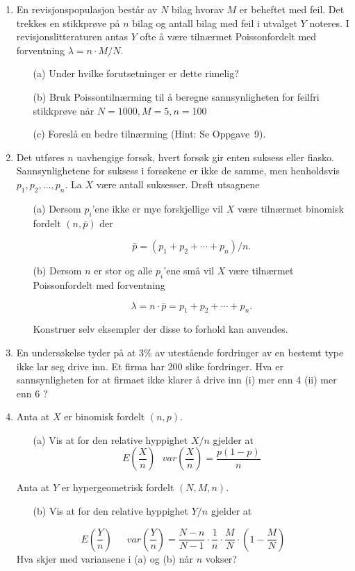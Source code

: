 \begin{enumerate}
\item En revisjonspopulasjon består av $N$ bilag hvorav $M$ er
     beheftet med feil. Det trekkes en stikkprøve på $n$ bilag og
     antall bilag med feil i utvalget $Y$ noteres. I
     revisjonslitteraturen antas $Y$ ofte å være tilnærmet
     Poissonfordelt med forventning $\lambda =n\cdot M/N$.
     \begin{itemize}
     \item[(a)]  Under hvilke forutsetninger er dette rimelig?
     \item[(b)]  Bruk Poissontilnærming til å beregne sannsynligheten
          for feilfri stikkprøve når $N=1000, M=5, n=100$
     \item[(c)]  Foreslå en bedre tilnærming (Hint: Se Oppgave~9).
     \end{itemize}

\item Det utføres $n$ uavhengige forsøk, hvert forsøk gir enten
     suksess eller fiasko. Sannsynlighetene for suksess i
     forsøkene er ikke de samme, men henholdsvis $p_1, p_2, \ldots,
     p_n$. La $X$ være antall suksesser. Drøft utsagnene
     \begin{itemize}
     \item[(a)]  Dersom $p_i$'ene ikke er mye forskjellige vil $X$ være
          tilnærmet binomisk fordelt $(n, \bar{p})$ der
            
           \[ \bar{p}=(p_1+p_2+\cdots +p_n)/n.  \]

     \item[(b)]  Dersom $n$ er stor og alle $p_i$'ene små vil $X$ være
          tilnærmet Poissonfordelt med forventning
            
           \[    \lambda =n \cdot \bar{p}=p_1+p_2+\cdots +p_n. \]

          Konstruer selv eksempler der disse to forhold kan anvendes.
     \end{itemize}

\item En undersøkelse tyder på at 3\% av utestående fordringer
  av en bestemt type ikke lar seg drive inn. Et firma har 200 slike fordringer.
     Hva er sannsynligheten for at firmaet ikke klarer å drive inn
     (i) mer enn 4 (ii) mer enn 6 ?

\item Anta at $X$ er binomisk fordelt $(n,p)$.
     \begin{itemize}
     \item[(a)]  Vis at for den relative hyppighet $X/n$ gjelder at
     \[   E(\frac{X}{n}) \mbox{\ \ \ } var(\frac{X}{n})=\frac{p(1-p)}{n} \]
     \end{itemize}
     Anta at $Y$ er hypergeometrisk fordelt $(N,M,n)$.
     \begin{itemize}
     \item[(b)]  Vis at for den relative hyppighet $Y/n$ gjelder at
     \end{itemize}
  \[ E(\frac{Y}{n}) \mbox{\ \ } \;\;\; var(\frac{Y}{n})=
  \frac{N-n}{N-1} \cdot \frac{1}{n} \cdot \frac{M}{N} \cdot (1- \frac{M}{N}) \]
     Hva skjer med variansene i (a) og (b) når $n$ vokser?


\end{enumerate}
